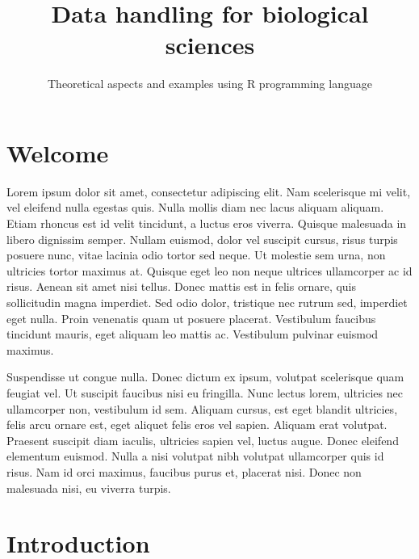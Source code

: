\documentclass[
  letterpaper,
  DIV=11,
  numbers=noendperiod]{scrreprt}
\title{Data handling for biological sciences}
\subtitle{Theoretical aspects and examples using R programming language}
\author{}
\date{}
\renewcommand*\contentsname{Table of contents}
\newcommand\contentsname{Table of contents}
\begin{document}
\maketitle
\ifdefined\Shaded\renewenvironment{Shaded}{\begin{tcolorbox}[breakable, boxrule=0pt, enhanced, sharp corners, frame hidden, borderline west={3pt}{0pt}{shadecolor}, interior hidden]}{\end{tcolorbox}}\fi

\renewcommand*\contentsname{Table of contents}
{
\hypersetup{linkcolor=}
\setcounter{tocdepth}{2}
\tableofcontents
}

\hypertarget{welcome}{%
\chapter*{Welcome}\label{welcome}}


Lorem ipsum dolor sit amet, consectetur adipiscing elit. Nam scelerisque
mi velit, vel eleifend nulla egestas quis. Nulla mollis diam nec lacus
aliquam aliquam. Etiam rhoncus est id velit tincidunt, a luctus eros
viverra. Quisque malesuada in libero dignissim semper. Nullam euismod,
dolor vel suscipit cursus, risus turpis posuere nunc, vitae lacinia odio
tortor sed neque. Ut molestie sem urna, non ultricies tortor maximus at.
Quisque eget leo non neque ultrices ullamcorper ac id risus. Aenean sit
amet nisi tellus. Donec mattis est in felis ornare, quis sollicitudin
magna imperdiet. Sed odio dolor, tristique nec rutrum sed, imperdiet
eget nulla. Proin venenatis quam ut posuere placerat. Vestibulum
faucibus tincidunt mauris, eget aliquam leo mattis ac. Vestibulum
pulvinar euismod maximus.

Suspendisse ut congue nulla. Donec dictum ex ipsum, volutpat scelerisque
quam feugiat vel. Ut suscipit faucibus nisi eu fringilla. Nunc lectus
lorem, ultricies nec ullamcorper non, vestibulum id sem. Aliquam cursus,
est eget blandit ultricies, felis arcu ornare est, eget aliquet felis
eros vel sapien. Aliquam erat volutpat. Praesent suscipit diam iaculis,
ultricies sapien vel, luctus augue. Donec eleifend elementum euismod.
Nulla a nisi volutpat nibh volutpat ullamcorper quis id risus. Nam id
orci maximus, faucibus purus et, placerat nisi. Donec non malesuada
nisi, eu viverra turpis.


\hypertarget{introduction}{%
\chapter{Introduction}\label{introduction}}
\end{document}
